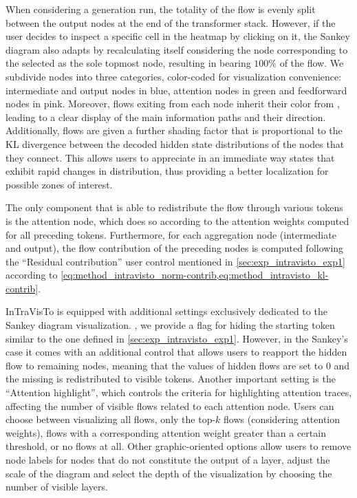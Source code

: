 When considering a  generation run, the totality of the flow is evenly split between the output nodes at the end of the transformer stack.
However, if the user decides to inspect a specific cell in the heatmap by clicking on it, the Sankey diagram also adapts by recalculating itself considering the node corresponding to the selected as the sole topmost node, resulting in  bearing $100\%$ of the flow.
We subdivide nodes into three categories, color-coded for visualization convenience: intermediate and output nodes in blue, attention nodes in green and feedforward nodes in pink.
Moreover, flows exiting from each node inherit their color from , leading to a clear display of the main information paths and their direction.
Additionally, flows are given a further shading factor that is proportional to the KL divergence between the decoded hidden state distributions of the nodes that they connect.
This allows users to appreciate in an immediate way states that exhibit rapid changes in distribution, thus providing a better localization for possible zones of interest.

The only component that is able to redistribute the flow through various tokens is the attention node, which does so according to the attention weights computed for all preceding tokens.
Furthermore, for each aggregation node (intermediate and output), the flow contribution of the preceding nodes is computed following the ``Residual contribution'' user control mentioned in \cref{sec:exp_intravisto_exp1} according to \cref{eq:method_intravisto_norm-contrib,eq:method_intravisto_kl-contrib}.


InTraVisTo is equipped with additional settings exclusively dedicated to the Sankey diagram visualization.
, we provide a flag for hiding the starting token similar to the one defined in \cref{sec:exp_intravisto_exp1}.
However, in the Sankey's case it comes with an additional control that allows users to reapport the hidden flow to remaining nodes, meaning that the values of hidden flows are set to $0$ and the missing  is redistributed to visible tokens.
Another important setting is the ``Attention highlight'', which controls the criteria for highlighting attention traces, affecting the number of visible flows related to each attention node.
Users can choose between visualizing all flows, only the top-$k$ flows (considering attention weights),  flows with a corresponding attention weight greater than a certain threshold, or no flows at all.
Other graphic-oriented options allow users to remove node labels for nodes that do not constitute the output of a layer, adjust the scale of the diagram and select the depth of the visualization by choosing the number of visible layers.

